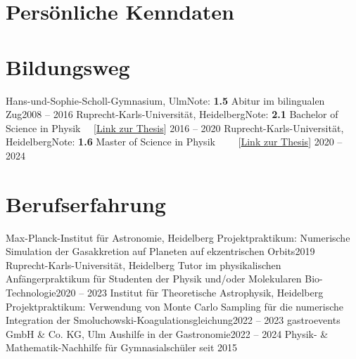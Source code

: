 \documentclass{cv}
\begin{document}
    \header
        \section{Persönliche Kenndaten}
        \personalDetails
        \section{Bildungsweg}\vspace*{1mm}
        \resumeSubHeadingListStart
            \resumeSubheading
                {Hans-und-Sophie-Scholl-Gymnasium\textnormal{, Ulm}}{Note: \textbf{1.5}}
                {Abitur im bilingualen Zug}{2008 -- 2016}
            \resumeSubheading
                {Ruprecht-Karls-Universität\textnormal{, Heidelberg}}{Note: \textbf{2.1}}
                {Bachelor of Science in Physik 
                    \ \ [\href{https://fs.mader.xyz/pdf/theses/bsc-thesis.pdf}{Link zur Thesis}]
                }{2016 -- 2020}
            \resumeSubheading
                {Ruprecht-Karls-Universität\textnormal{, Heidelberg}}{Note: \textbf{1.6}}
                {Master of Science in Physik
                    \ \ \ \ [\href{https://fs.mader.xyz/pdf/theses/msc-thesis.pdf}{Link zur Thesis}]
                }{2020 -- 2024}
        \resumeSubHeadingListEnd\vspace*{1mm}
        \section{Berufserfahrung}\vspace*{1mm}
        \resumeSubHeadingListStart
            \resumeSubheading
                {Max-Planck-Institut f\"ur Astronomie\textnormal{, Heidelberg}}{}
                {Projektpraktikum: Numerische Simulation der Gasakkretion auf Planeten auf
                    ekzentrischen Orbits}{2019}
            \resumeSubheading
                {Ruprecht-Karls-Universität\textnormal{, Heidelberg}}{}
                {Tutor im physikalischen Anfängerpraktikum für Studenten der Physik und/oder
                 Molekularen Bio-Technologie}{2020 -- 2023}
            \resumeSubheading
                {Institut f\"ur Theoretische Astrophysik\textnormal{, Heidelberg}}{}
                {Projektpraktikum: Verwendung von Monte Carlo Sampling für die numerische
                    Integration der Smoluchowski-Koagulationsgleichung}{2022 -- 2023}
            \resumeSubheading
                {gastroevents GmbH \& Co. KG\textnormal{, Ulm}}{}
                {Aushilfe in der Gastronomie}{2022 -- 2024}
            \resumeSubheading
                {Physik- \& Mathematik-Nachhilfe für Gymnasialschüler}{}
                {}{seit 2015}\vspace*{-4mm}
        \resumeSubHeadingListEnd
\end{document}
